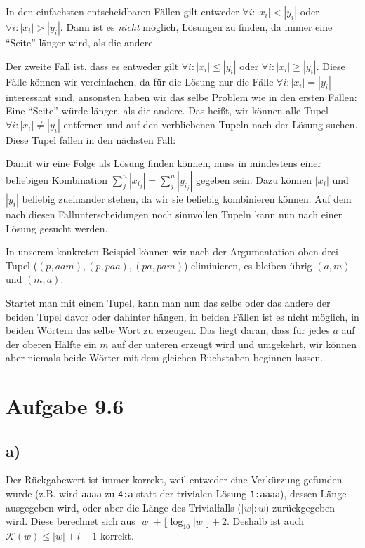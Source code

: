 \documentclass{article}
\begin{document}
In den einfachsten entscheidbaren Fällen gilt entweder $\forall i: |x_i| < |y_i|$ oder $\forall i: |x_i| > |y_i|$. Dann ist es \emph{nicht} möglich, Lösungen zu finden, da immer eine "`Seite"' länger wird, als die andere.

Der zweite Fall ist, dass es entweder gilt $\forall i: |x_i| \leq |y_i|$ oder $\forall i: |x_i| \geq |y_i|$. Diese Fälle können wir vereinfachen, da für die Lösung nur die Fälle $\forall i: |x_i| = |y_i|$ interessant sind, ansonsten haben wir das selbe Problem wie in den ersten Fällen: Eine "`Seite"' würde länger, als die andere. Das heißt, wir können alle Tupel $\forall i: |x_i| \neq |y_i|$ entfernen und auf den verbliebenen Tupeln nach der Lösung suchen. Diese Tupel fallen in den nächsten Fall:

Damit wir eine Folge als Lösung finden können, muss in mindestens einer beliebigen Kombination $\sum_j^n |x_{i_j}| = \sum_j^n |y_{i_j}|$ gegeben sein. Dazu können $|x_i|$ und $|y_i|$ beliebig zueinander stehen, da wir sie beliebig kombinieren können. Auf dem nach diesen Fallunterscheidungen noch sinnvollen Tupeln kann nun nach einer Lösung gesucht werden.

In unserem konkreten Beispiel können wir nach der Argumentation oben drei Tupel ($(p,aam),(p,paa),(pa,pam)$) eliminieren, es bleiben übrig $(a,m)$ und $(m,a)$. 

Startet man mit einem Tupel, kann man nun das selbe oder das andere der beiden Tupel davor oder dahinter hängen, in beiden Fällen ist es nicht möglich, in beiden Wörtern das selbe Wort zu erzeugen. Das liegt daran, dass für jedes $a$ auf der oberen Hälfte ein $m$ auf der unteren erzeugt wird und umgekehrt, wir können aber niemals beide Wörter mit dem gleichen Buchstaben beginnen lassen.



\section*{Aufgabe 9.6}

\subsection*{a)}
Der Rückgabewert ist immer korrekt, weil entweder eine Verkürzung gefunden wurde (z.B. wird \texttt{aaaa} zu \texttt{4:a} statt der trivialen Lösung \texttt{1:aaaa}), dessen Länge ausgegeben wird, oder aber die Länge des Trivialfalls ($|w|:w$) zurückgegeben wird. Diese berechnet sich aus $|w|+\lfloor \log_10 |w| \rfloor + 2$. Deshalb ist auch $\mathcal{K}(w)\leq |w|+l+1$ korrekt.
\end{document}
